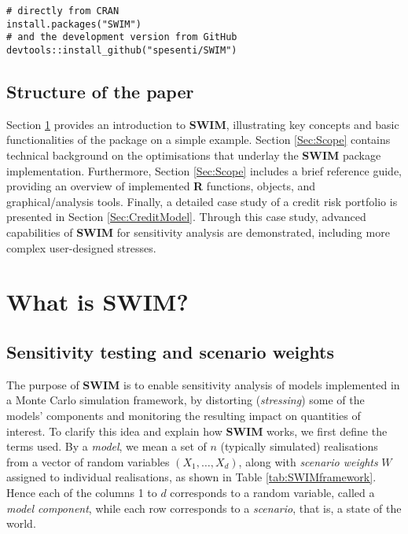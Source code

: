 \documentclass[
]{article}
\begin{document}
\begin{verbatim}
# directly from CRAN
install.packages("SWIM")
# and the development version from GitHub 
devtools::install_github("spesenti/SWIM")
\end{verbatim}

\hypertarget{structure-of-the-paper}{%
\subsection{Structure of the paper}\label{structure-of-the-paper}}

Section \ref{Sec:Intro} provides an introduction to \textbf{SWIM}, illustrating key concepts and basic functionalities of the package on a simple example. Section
\ref{Sec:Scope} contains technical background on the optimisations that underlay the \textbf{SWIM} package implementation. Furthermore, Section \ref{Sec:Scope} includes a brief reference guide, providing an overview of implemented \textbf{R} functions, objects, and graphical/analysis tools. Finally, a detailed case study of a credit risk portfolio is presented in Section \ref{Sec:CreditModel}. Through this case study, advanced capabilities of \textbf{SWIM} for sensitivity analysis are demonstrated, including more complex user-designed stresses.

\hypertarget{Sec:Intro}{%
\section{\texorpdfstring{What is \textbf{SWIM}?}{What is SWIM?}}\label{Sec:Intro}}

\hypertarget{sensitivity-testing-and-scenario-weights}{%
\subsection{Sensitivity testing and scenario weights}\label{sensitivity-testing-and-scenario-weights}}

The purpose of \textbf{SWIM} is to enable sensitivity analysis of models implemented in a Monte Carlo simulation framework, by distorting (\emph{stressing}) some of the models' components and monitoring the resulting impact on quantities of interest.
To clarify this idea and explain how \textbf{SWIM} works, we first define the terms used. By a \emph{model}, we mean a set of \(n\) (typically simulated) realisations from a vector of random variables \((X_1,\dots,X_d)\), along with \emph{scenario weights} \(W\) assigned to individual realisations, as shown in Table \ref{tab:SWIMframework}. Hence each of the columns 1 to \(d\) corresponds to a random variable, called a \emph{model component}, while each row corresponds to a \emph{scenario}, that is, a state of the world.
\end{document}

